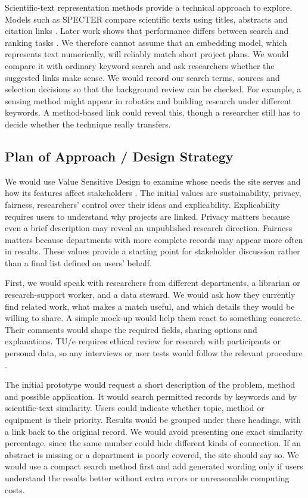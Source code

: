 \documentclass[11pt,a4paper]{article}
\begin{document}
Scientific-text representation methods provide a technical approach to explore. Models such as SPECTER compare scientific texts using titles, abstracts and citation links \citep{cohan2020}. Later work shows that performance differs between search and ranking tasks \citep{singh2023}. We therefore cannot assume that an embedding model, which represents text numerically, will reliably match short project plans. We would compare it with ordinary keyword search and ask researchers whether the suggested links make sense. We would record our search terms, sources and selection decisions so that the background review can be checked. For example, a sensing method might appear in robotics and building research under different keywords. A method-based link could reveal this, though a researcher still has to decide whether the technique really transfers.

\subsection*{Plan of Approach / Design Strategy}

We would use Value Sensitive Design to examine whose needs the site serves and how its features affect stakeholders \citep{friedman2008}. The initial values are sustainability, privacy, fairness, researchers' control over their ideas and explicability. Explicability requires users to understand why projects are linked. Privacy matters because even a brief description may reveal an unpublished research direction. Fairness matters because departments with more complete records may appear more often in results. These values provide a starting point for stakeholder discussion rather than a final list defined on users' behalf.

First, we would speak with researchers from different departments, a librarian or research-support worker, and a data steward. We would ask how they currently find related work, what makes a match useful, and which details they would be willing to share. A simple mock-up would help them react to something concrete. Their comments would shape the required fields, sharing options and explanations. TU/e requires ethical review for research with participants or personal data, so any interviews or user tests would follow the relevant procedure \citep{tueethics}.

The initial prototype would request a short description of the problem, method and possible application. It would search permitted records by keywords and by scientific-text similarity. Users could indicate whether topic, method or equipment is their priority. Results would be grouped under these headings, with a link back to the original record. We would avoid presenting one exact similarity percentage, since the same number could hide different kinds of connection. If an abstract is missing or a department is poorly covered, the site should say so. We would use a compact search method first and add generated wording only if users understand the results better without extra errors or unreasonable computing costs.
\end{document}
